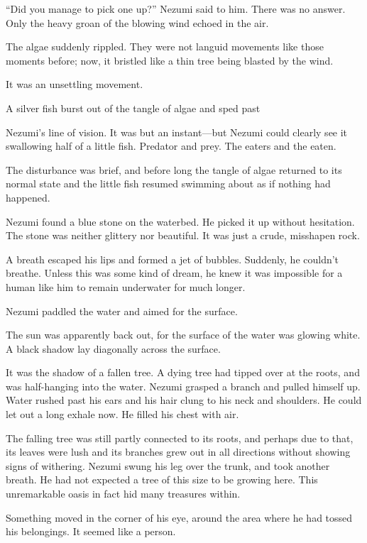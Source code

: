 ``Did you manage to pick one up?'' Nezumi said to him. There was no
answer. Only the heavy groan of the blowing wind echoed in the air.

\mybreak

The algae suddenly rippled. They were not languid movements like those
moments before; now, it bristled like a thin tree being blasted by the
wind.

It was an unsettling movement.

A silver fish burst out of the tangle of algae and sped past~

Nezumi's line of vision. It was but an instant---but Nezumi could clearly
see it swallowing half of a little fish. Predator and prey. The eaters
and the eaten.

The disturbance was brief, and before long the tangle of algae returned
to its normal state and the little fish resumed swimming about as if
nothing had happened.

Nezumi found a blue stone on the waterbed. He picked it up without
hesitation. The stone was neither glittery nor beautiful. It was just a
crude, misshapen rock.

A breath escaped his lips and formed a jet of bubbles. Suddenly, he
couldn't breathe. Unless this was some kind of dream, he knew it was
impossible for a human like him to remain underwater for much longer.

Nezumi paddled the water and aimed for the surface.

The sun was apparently back out, for the surface of the water was
glowing white. A black shadow lay diagonally across the surface.~

It was the shadow of a fallen tree. A dying tree had tipped over at the
roots, and was half-hanging into the water. Nezumi grasped a branch and
pulled himself up. Water rushed past his ears and his hair clung to his
neck and shoulders. He could let out a long exhale now. He filled his
chest with air.

The falling tree was still partly connected to its roots, and perhaps
due to that, its leaves were lush and its branches grew out in all
directions without showing signs of withering. Nezumi swung his leg over
the trunk, and took another breath. He had not expected a tree of this
size to be growing here. This unremarkable oasis in fact hid many
treasures within.

Something moved in the corner of his eye, around the area where he had
tossed his belongings. It seemed like a person.

